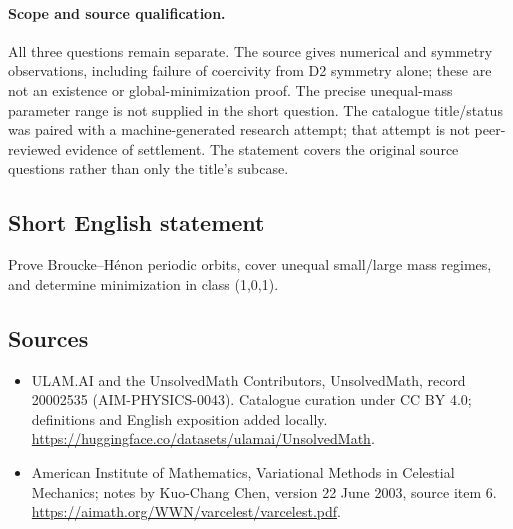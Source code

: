 \documentclass[11pt]{article}
\begin{document}
\paragraph{Scope and source qualification.}All three questions remain separate. The source gives numerical and symmetry observations, including failure of coercivity from D2 symmetry alone; these are not an existence or global-minimization proof. The precise unequal-mass parameter range is not supplied in the short question. The catalogue title/status was paired with a machine-generated research attempt; that attempt is not peer-reviewed evidence of settlement. The statement covers the original source questions rather than only the title’s subcase.
\subsection{Short English statement}
Prove Broucke–Hénon periodic orbits, cover unequal small/large mass regimes, and determine minimization in class (1,0,1).
\subsection{Sources}
\begin{itemize}
\item[\hypertarget{source:20002535:1}{S1}] ULAM.AI and the UnsolvedMath Contributors, UnsolvedMath, record 20002535 (AIM-PHYSICS-0043). Catalogue curation under CC BY 4.0; definitions and English exposition added locally.
\url{https://huggingface.co/datasets/ulamai/UnsolvedMath}.
\item[\hypertarget{source:20002535:2}{S2}] American Institute of Mathematics, Variational Methods in Celestial Mechanics; notes by Kuo-Chang Chen, version 22 June 2003, source item 6.
\url{https://aimath.org/WWN/varcelest/varcelest.pdf}.
\end{itemize}
\label{end:20002535}
\end{document}
